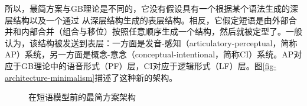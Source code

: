 所以，最简方案与GB理论是不同的，它没有假设具有一个根据某个\xbarc 语法生成的深层结构以及一个通过\moveac
从深层结构生成的表层结构。相反，它假定短语是由外部合并和内部合并（组合与移位）按照任意顺序生成一个结构，然后就被定型了。一般认为，该结构被发送到表层：一方面是发音-感知（articulatory-perceptual，简称AP）系统，另一方面是概念-意念（conceptual-intentional，简称CI）系统。AP对应于GB理论中的语音形式（PF）层，CI对应于逻辑形式（LF）层。图\vref{fig-architecture-minimalism}描述了这种新的架构。
\begin{figure}
\caption{\label{fig-architecture-minimalism}在短语模型前的最简方案架构}
\end{figure}%
